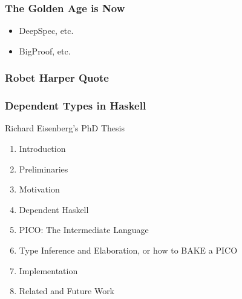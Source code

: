 \documentclass{beamer}
\begin{document}
\begin{frame}\frametitle{The Golden Age is Now}
\begin{itemize}
\item DeepSpec, etc.
\item BigProof, etc.
\end{itemize}
\end{frame}

\begin{frame}\frametitle{Robet Harper Quote}
\end{frame}

\begin{frame}\frametitle{Dependent Types in Haskell}
Richard Eisenberg's PhD Thesis  
\begin{enumerate}
\item Introduction
\item Preliminaries
\item Motivation
\item Dependent Haskell
\item PICO: The Intermediate Language
\item Type Inference and Elaboration, or how to BAKE a PICO
\item Implementation
\item Related and Future Work
\end{enumerate}
\end{frame}

\begin{frame}\frametitle{}
\end{frame}

\begin{frame}\frametitle{}
\end{frame}
\end{document}
